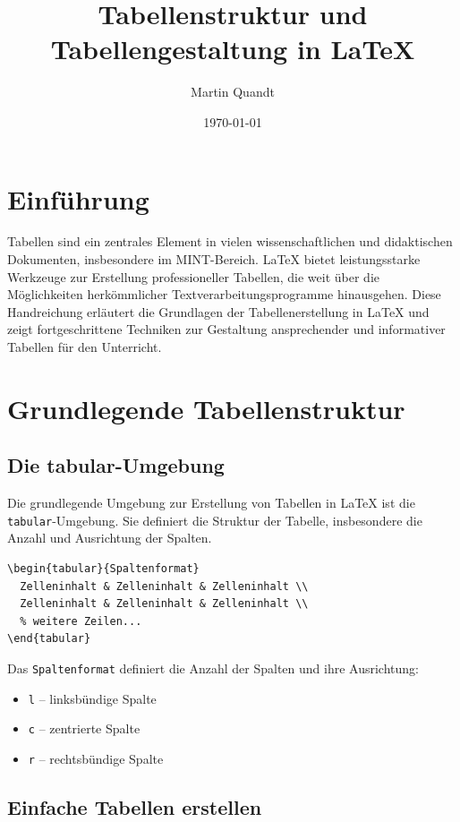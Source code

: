 \documentclass[12pt,a4paper]{article}
\title{Tabellenstruktur und Tabellengestaltung in LaTeX}
\author{Martin Quandt}
\date{\today}
\begin{document}
\maketitle
\section{Einführung}

Tabellen sind ein zentrales Element in vielen wissenschaftlichen und didaktischen Dokumenten, insbesondere im MINT-Bereich. LaTeX bietet leistungsstarke Werkzeuge zur Erstellung professioneller Tabellen, die weit über die Möglichkeiten herkömmlicher Textverarbeitungsprogramme hinausgehen. Diese Handreichung erläutert die Grundlagen der Tabellenerstellung in LaTeX und zeigt fortgeschrittene Techniken zur Gestaltung ansprechender und informativer Tabellen für den Unterricht.

\section{Grundlegende Tabellenstruktur}

\subsection{Die tabular-Umgebung}

Die grundlegende Umgebung zur Erstellung von Tabellen in LaTeX ist die \texttt{tabular}-Umgebung. Sie definiert die Struktur der Tabelle, insbesondere die Anzahl und Ausrichtung der Spalten.

\begin{lstlisting}[style=latex]
\begin{tabular}{Spaltenformat}
  Zelleninhalt & Zelleninhalt & Zelleninhalt \\
  Zelleninhalt & Zelleninhalt & Zelleninhalt \\
  % weitere Zeilen...
\end{tabular}
\end{lstlisting}

Das \texttt{Spaltenformat} definiert die Anzahl der Spalten und ihre Ausrichtung:
\begin{itemize}
    \item \texttt{l} – linksbündige Spalte
    \item \texttt{c} – zentrierte Spalte
    \item \texttt{r} – rechtsbündige Spalte
\end{itemize}

\subsection{Einfache Tabellen erstellen}
\end{document}
